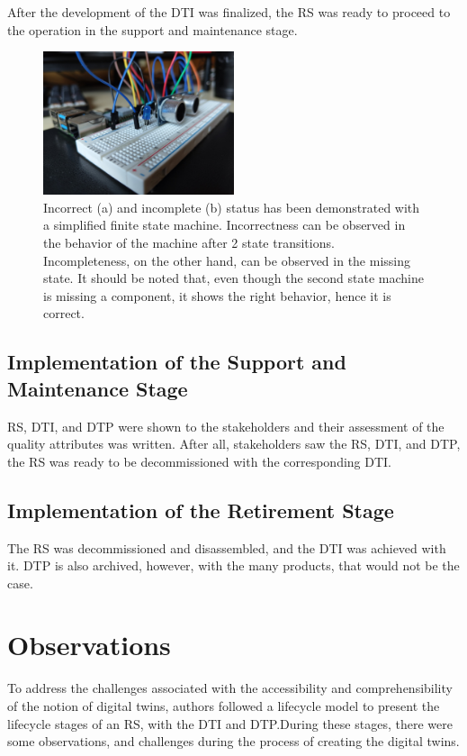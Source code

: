 \documentclass[conference]{IEEEtran}
\begin{document}
    After the development of the DTI was finalized, the RS was ready to proceed to the operation in the support and maintenance stage.

    \begin{figure}[htbp]
        \centering
        \includegraphics[width=0.5\textwidth]{Assembled.jpg}
        \caption{Incorrect (a) and incomplete (b) status has been demonstrated with a simplified finite state machine. Incorrectness can be observed in the behavior 
        of the machine after 2 state transitions. Incompleteness, on the other hand, can be observed in the missing state. It should be noted that, even though the second state machine is missing a 
        component, it shows the right behavior, hence it is correct.}\label{fig:Assembled}
    \end{figure}

    \subsection{Implementation of the Support and Maintenance Stage}
    RS, DTI, and DTP were shown to the stakeholders and their assessment of the quality attributes was written. After all, stakeholders saw the RS, DTI, and DTP, the RS was ready to be decommissioned with the corresponding DTI.
    
    \subsection{Implementation of the Retirement Stage}
    The RS was decommissioned and disassembled, and the DTI was achieved with it. DTP is also archived, however, with the many products, that would not be the case.

    \section{Observations} 
    To address the challenges associated with the accessibility and comprehensibility of the notion of digital twins, authors followed a lifecycle model to present the lifecycle stages of an RS, with the DTI and DTP.During these stages, there were some observations, and challenges during the process of creating the digital twins. 
    
\end{document}
